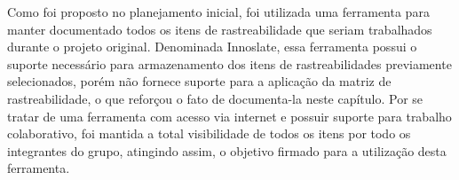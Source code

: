 Como foi proposto no planejamento inicial, foi utilizada uma ferramenta para manter documentado todos os itens de rastreabilidade que seriam trabalhados durante o projeto original. Denominada Innoslate, essa ferramenta possui o suporte necessário para armazenamento dos itens de rastreabilidades previamente selecionados, porém não fornece suporte para a aplicação da matriz de rastreabilidade, o que reforçou o fato de documenta-la neste capítulo. Por se tratar de uma ferramenta com acesso via internet e possuir suporte para trabalho colaborativo, foi mantida a total visibilidade de todos os itens por todo os integrantes do grupo, atingindo assim, o objetivo firmado para a utilização desta ferramenta.

